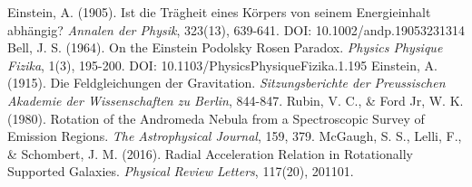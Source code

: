 \documentclass[12pt,a4paper]{article}
\begin{document}
\begin{thebibliography}{99}
		 Einstein, A. (1905). Ist die Trägheit eines Körpers von seinem Energieinhalt abhängig? \textit{Annalen der Physik}, 323(13), 639-641. DOI: 10.1002/andp.19053231314
		 Bell, J. S. (1964). On the Einstein Podolsky Rosen Paradox. \textit{Physics Physique Fizika}, 1(3), 195-200. DOI: 10.1103/PhysicsPhysiqueFizika.1.195
		 Einstein, A. (1915). Die Feldgleichungen der Gravitation. \textit{Sitzungsberichte der Preussischen Akademie der Wissenschaften zu Berlin}, 844-847.
		 Rubin, V. C., \& Ford Jr, W. K. (1980). Rotation of the Andromeda Nebula from a Spectroscopic Survey of Emission Regions. \textit{The Astrophysical Journal}, 159, 379.
		 McGaugh, S. S., Lelli, F., \& Schombert, J. M. (2016). Radial Acceleration Relation in Rotationally Supported Galaxies. \textit{Physical Review Letters}, 117(20), 201101.
	\end{thebibliography}
	
\end{document}
